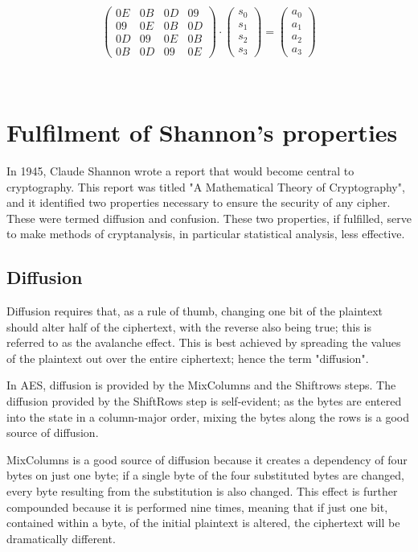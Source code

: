 \documentclass[12pt, a4paper]{report}
\theoremstyle{definition}
\theoremstyle{remark}
\begin{document}
\[ \left( \begin{array}{cccc}
0E & 0B & 0D & 09 \\
09 & 0E & 0B & 0D \\
0D & 09 & 0E & 0B \\
0B & 0D & 09 & 0E\end{array} \right)
\cdot
\left( \begin{array}{c}
s_0 \\
s_1 \\
s_2 \\
s_3\end{array} \right)
=
\left( \begin{array}{c}
a_0 \\
a_1 \\
a_2 \\
a_3\end{array} \right)
\]

\hfill \\

\section{Fulfilment of Shannon's properties}
In 1945, Claude Shannon wrote a report that would become central to cryptography. This report was titled "A Mathematical Theory of Cryptography", and it identified two properties necessary to ensure the security of any cipher\cite{ShannonProperties}. These were termed diffusion and confusion. These two properties, if fulfilled, serve to make methods of cryptanalysis, in particular statistical analysis, less effective.

\subsection{Diffusion}
Diffusion requires that, as a rule of thumb, changing one bit of the plaintext should alter half of the ciphertext, with the reverse also being true; this is referred to as the avalanche effect\cite{AvalancheEffect}. This is best achieved by spreading the values of the plaintext out over the entire ciphertext; hence the term "diffusion".

In AES, diffusion is  provided by the MixColumns and the Shiftrows steps. The diffusion provided by the ShiftRows step is self-evident; as the bytes are entered into the state in a column-major order, mixing the bytes along the rows is a good source of diffusion.

MixColumns is a good source of diffusion because it creates a dependency of four bytes on just one byte; if a single byte of the four substituted bytes are changed, every byte resulting from the substitution is also changed. This effect is further compounded because it is performed nine times, meaning that if just one bit, contained within a byte, of the initial plaintext is altered, the ciphertext will be dramatically different.
\end{document}
